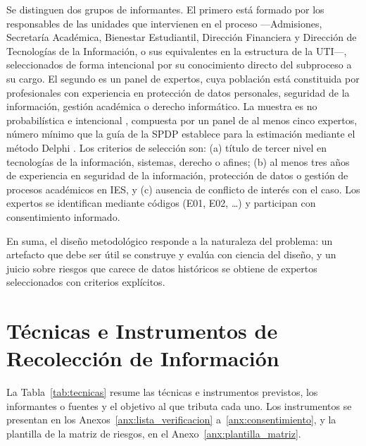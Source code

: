 Se distinguen dos grupos de informantes. El primero está formado por los responsables de las unidades que intervienen en el proceso ---Admisiones, Secretaría Académica, Bienestar Estudiantil, Dirección Financiera y Dirección de Tecnologías de la Información, o sus equivalentes en la estructura de la UTI---, seleccionados de forma intencional por su conocimiento directo del subproceso a su cargo. El segundo es un panel de expertos, cuya población está constituida por profesionales con experiencia en protección de datos personales, seguridad de la información, gestión académica o derecho informático. La muestra es no probabilística e intencional \cite{hernandez2018metodologia}, compuesta por un panel de al menos cinco expertos, número mínimo que la guía de la SPDP establece para la estimación mediante el método Delphi \cite{spdp2026guiav2}. Los criterios de selección son: (a) título de tercer nivel en tecnologías de la información, sistemas, derecho o afines; (b) al menos tres años de experiencia en seguridad de la información, protección de datos o gestión de procesos académicos en IES, y (c) ausencia de conflicto de interés con el caso. Los expertos se identifican mediante códigos (E01, E02, \ldots) y participan con consentimiento informado.

En suma, el diseño metodológico responde a la naturaleza del problema: un artefacto que debe ser útil se construye y evalúa con ciencia del diseño, y un juicio sobre riesgos que carece de datos históricos se obtiene de expertos seleccionados con criterios explícitos.

\section{Técnicas e Instrumentos de Recolección de Información}

La Tabla~\ref{tab:tecnicas} resume las técnicas e instrumentos previstos, los informantes o fuentes y el objetivo al que tributa cada uno. Los instrumentos se presentan en los Anexos~\ref{anx:lista_verificacion} a~\ref{anx:consentimiento}, y la plantilla de la matriz de riesgos, en el Anexo~\ref{anx:plantilla_matriz}.


